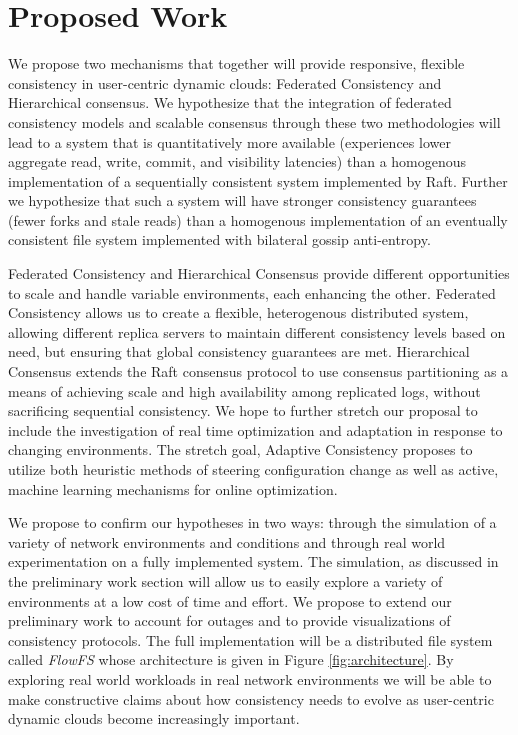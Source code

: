 \documentclass{article}
\begin{document}
\section{Proposed Work}
\label{sec:proposed_work}

We propose two mechanisms that together will provide responsive, flexible consistency in user-centric dynamic clouds: Federated Consistency and Hierarchical consensus. We hypothesize that the integration of federated consistency models and scalable consensus through these two methodologies will lead to a system that is quantitatively more available (experiences lower aggregate read, write, commit, and visibility latencies) than a homogenous implementation of a sequentially consistent system implemented by Raft. Further we hypothesize that such a system will have stronger consistency guarantees (fewer forks and stale reads) than a homogenous implementation of an eventually consistent file system implemented with bilateral gossip anti-entropy.

Federated Consistency and Hierarchical Consensus provide different opportunities to scale and handle variable environments, each enhancing the other. Federated Consistency allows us to create a flexible, heterogenous distributed system, allowing different replica servers to maintain different consistency levels based on need, but ensuring that global consistency guarantees are met. Hierarchical Consensus extends the Raft consensus protocol to use consensus partitioning as a means of achieving scale and high availability among replicated logs, without sacrificing sequential consistency. We hope to further stretch our proposal to include the investigation of real time optimization and adaptation in response to changing environments. The stretch goal, Adaptive Consistency proposes to utilize both heuristic methods of steering configuration change as well as active, machine learning mechanisms for online optimization.

We propose to confirm our hypotheses in two ways: through the simulation of a variety of network environments and conditions and through real world experimentation on a fully implemented system. The simulation, as discussed in the preliminary work section will allow us to easily explore a variety of environments at a low cost of time and effort. We propose to extend our preliminary work to account for outages and to provide visualizations of consistency protocols. The full implementation will be a distributed file system called \emph{FlowFS} whose architecture is given in Figure \ref{fig:architecture}. By exploring real world workloads in real network environments we will be able to make constructive claims about how consistency needs to evolve as user-centric dynamic clouds become increasingly important.
\end{document}
